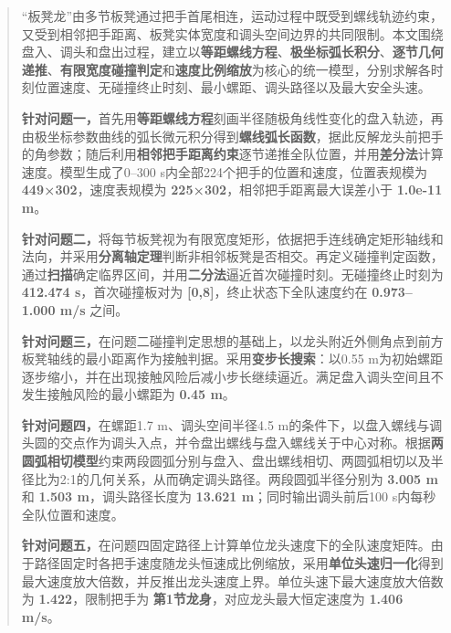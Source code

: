 \begin{abstract}
“板凳龙”由多节板凳通过把手首尾相连，运动过程中既受到螺线轨迹约束，又受到相邻把手距离、板凳实体宽度和调头空间边界的共同限制。本文围绕盘入、调头和盘出过程，建立以\textbf{等距螺线方程}、\textbf{极坐标弧长积分}、\textbf{逐节几何递推}、\textbf{有限宽度碰撞判定}和\textbf{速度比例缩放}为核心的统一模型，分别求解各时刻位置速度、无碰撞终止时刻、最小螺距、调头路径以及最大安全头速。

\textbf{针对问题一，}首先用\textbf{等距螺线方程}刻画半径随极角线性变化的盘入轨迹，再由极坐标参数曲线的弧长微元积分得到\textbf{螺线弧长函数}，据此反解龙头前把手的角参数；随后利用\textbf{相邻把手距离约束}逐节递推全队位置，并用\textbf{差分法}计算速度。模型生成了0--300 s内全部224个把手的位置和速度，位置表规模为 \textbf{449×302}，速度表规模为 \textbf{225×302}，相邻把手距离最大误差小于 \textbf{1.0e-11 m}。

\textbf{针对问题二，}将每节板凳视为有限宽度矩形，依据把手连线确定矩形轴线和法向，并采用\textbf{分离轴定理}判断非相邻板凳是否相交。再定义碰撞判定函数，通过\textbf{扫描}确定临界区间，并用\textbf{二分法}逼近首次碰撞时刻。无碰撞终止时刻为 \textbf{412.474 s}，首次碰撞板对为 \textbf{[0,8]}，终止状态下全队速度约在 \textbf{0.973--1.000 m/s} 之间。

\textbf{针对问题三，}在问题二碰撞判定思想的基础上，以龙头附近外侧角点到前方板凳轴线的最小距离作为接触判据。采用\textbf{变步长搜索}：以0.55 m为初始螺距逐步缩小，并在出现接触风险后减小步长继续逼近。满足盘入调头空间且不发生接触风险的最小螺距为 \textbf{0.45 m}。

\textbf{针对问题四，}在螺距1.7 m、调头空间半径4.5 m的条件下，以盘入螺线与调头圆的交点作为调头入点，并令盘出螺线与盘入螺线关于中心对称。根据\textbf{两圆弧相切模型}约束两段圆弧分别与盘入、盘出螺线相切、两圆弧相切以及半径比为2:1的几何关系，从而确定调头路径。两段圆弧半径分别为 \textbf{3.005 m} 和 \textbf{1.503 m}，调头路径长度为 \textbf{13.621 m}；同时输出调头前后100 s内每秒全队位置和速度。

\textbf{针对问题五，}在问题四固定路径上计算单位龙头速度下的全队速度矩阵。由于路径固定时各把手速度随龙头恒速成比例缩放，采用\textbf{单位头速归一化}得到最大速度放大倍数，并反推出龙头速度上界。单位头速下最大速度放大倍数为 \textbf{1.422}，限制把手为 \textbf{第1节龙身}，对应龙头最大恒定速度为 \textbf{1.406 m/s}。

\end{abstract}
